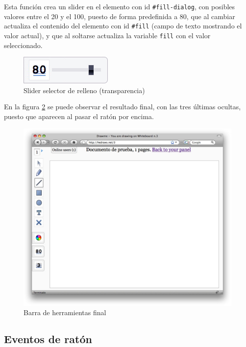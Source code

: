 Esta función crea un slider en el elemento con id \texttt{\#fill-dialog}, con posibles valores entre el 20 y el 100, puesto de forma predefinida a 80, que al cambiar actualiza el contenido del elemento con id \texttt{\#fill} (campo de texto mostrando el valor actual), y que al soltarse actualiza la variable \texttt{fill} con el valor seleccionado.

\begin{figure}[h!]
\centering
\includegraphics{fill_selector.png}
\caption{Slider selector de relleno (transparencia)}\label{fig:fill_selector}
\end{figure}

En la figura \ref{fig:herramientas} se puede observar el resultado final, con las tres últimas ocultas, puesto que aparecen al pasar el ratón por encima.

\begin{figure}[h!]
\centering
\includegraphics[totalheight=0.6\textheight]{resultadofinal.jpg}
\caption{Barra de herramientas final}\label{fig:herramientas}
\end{figure}




\subsection{Eventos de ratón} %
\label{sub:eventos_de_raton}

